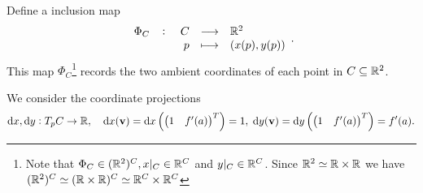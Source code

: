 \documentclass[11pt,openany]{article}
\renewcommand{\vec}[1]{\mathbf{#1}}
\begin{document}
Define a inclusion map \[
\fullfunction{\Phi_C}{C}{\R^2}{p}{(x(p), y(p))}.
\]
This map $\Phi_C$\footnote{\color{gray!50}Note that $\Phi_C\in(\mathbb{R}^2)^C, x|_C\in\mathbb{R}^C$ and $y|_C\in\mathbb{R}^C$. Since $\mathbb{R}^2\simeq\mathbb{R}\times\mathbb{R}$ we have $(\mathbb{R}^2)^C\simeq (\mathbb{R}\times\mathbb{R})^C\simeq\mathbb{R}^C\times\mathbb{R}^C$} records the two ambient coordinates of each point in \(C\subseteq\mathbb{R}^2\).

\newpage\noindent
We consider the coordinate projections \[
\mathrm{d}x,\mathrm{d}y:T_pC\to\R,\quad \mathrm{d}x(\vec{v})=\mathrm{d}x\left(\begin{pmatrix}
	1& f'(a)
\end{pmatrix}^T\right)=1,\;
\mathrm{d}y(\vec{v})=\mathrm{d}y\left(\begin{pmatrix}
	1& f'(a)
\end{pmatrix}^T\right)=f'(a).
\]
\end{document}
